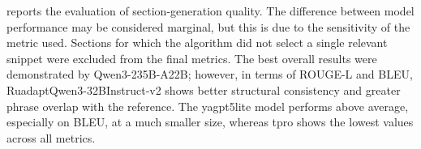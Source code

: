 \documentclass{superfri}
\begin{document}

 reports the evaluation of section-generation quality. The difference between model performance may be considered marginal, but this is due to the sensitivity of the metric used.
Sections for which the algorithm did not select a single relevant snippet were excluded from the final metrics. The best overall results
were demonstrated by Qwen3-\allowbreak 235B-\allowbreak A22B; however, in terms of ROUGE-\allowbreak L and BLEU, RuadaptQwen3-\allowbreak 32BInstruct-v2 shows better structural consistency and
greater phrase overlap with the reference.
The yagpt5lite model performs above average, especially on BLEU, at a much smaller size, whereas tpro shows the lowest values across all metrics.
\end{document}

